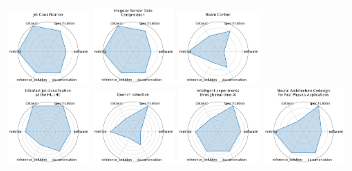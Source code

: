 \begin{figure}[ht!]
\includegraphics[width=0.1900\textwidth]{images/jet_classification_radar.pdf}
\includegraphics[width=0.1900\textwidth]{images/irregular_sensor_data_compression_radar.pdf}
\includegraphics[width=0.1900\textwidth]{images/beam_control_radar.pdf}
\\[1ex]
\includegraphics[width=0.1900\textwidth]{images/ultrafast_jet_classification_at_the_hl-lhc_radar.pdf}
\includegraphics[width=0.1900\textwidth]{images/quench_detection_radar.pdf}
\includegraphics[width=0.1900\textwidth]{images/intelligent_experiments_through_real-time_ai_radar.pdf}
\includegraphics[width=0.1900\textwidth]{images/neural_architecture_codesign_for_fast_physics_applications_radar.pdf}

\end{figure}
